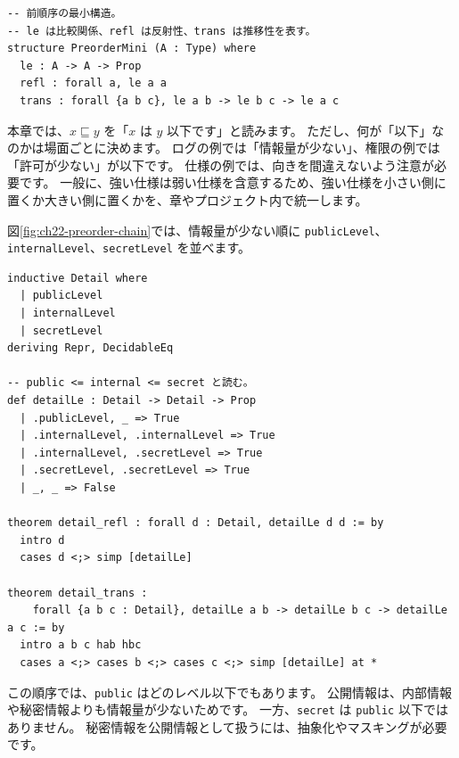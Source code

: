 \begin{listing}[htbp]
\begin{verbatim}
-- 前順序の最小構造。
-- le は比較関係、refl は反射性、trans は推移性を表す。
structure PreorderMini (A : Type) where
  le : A -> A -> Prop
  refl : forall a, le a a
  trans : forall {a b c}, le a b -> le b c -> le a c
\end{verbatim}
\caption{\texttt{PreorderMini}}
\label{lst:ch22-preorder-mini}
\end{listing}

本章では、\(x \sqsubseteq y\) を「\(x\) は \(y\) 以下です」と読みます。
ただし、何が「以下」なのかは場面ごとに決めます。
ログの例では「情報量が少ない」、権限の例では「許可が少ない」が以下です。
仕様の例では、向きを間違えないよう注意が必要です。
一般に、強い仕様は弱い仕様を含意するため、強い仕様を小さい側に置くか大きい側に置くかを、章やプロジェクト内で統一します。

図\ref{fig:ch22-preorder-chain}では、情報量が少ない順に
\texttt{publicLevel}、\texttt{internalLevel}、\texttt{secretLevel} を並べます。


\begin{listing}[htbp]
\begin{verbatim}
inductive Detail where
  | publicLevel
  | internalLevel
  | secretLevel
deriving Repr, DecidableEq

-- public <= internal <= secret と読む。
def detailLe : Detail -> Detail -> Prop
  | .publicLevel, _ => True
  | .internalLevel, .internalLevel => True
  | .internalLevel, .secretLevel => True
  | .secretLevel, .secretLevel => True
  | _, _ => False

theorem detail_refl : forall d : Detail, detailLe d d := by
  intro d
  cases d <;> simp [detailLe]

theorem detail_trans :
    forall {a b c : Detail}, detailLe a b -> detailLe b c -> detailLe a c := by
  intro a b c hab hbc
  cases a <;> cases b <;> cases c <;> simp [detailLe] at *
\end{verbatim}
\caption{\texttt{detailLe}}
\label{lst:ch22-detail-preorder}
\end{listing}

この順序では、\texttt{public} はどのレベル以下でもあります。
公開情報は、内部情報や秘密情報よりも情報量が少ないためです。
一方、\texttt{secret} は \texttt{public} 以下ではありません。
秘密情報を公開情報として扱うには、抽象化やマスキングが必要です。

